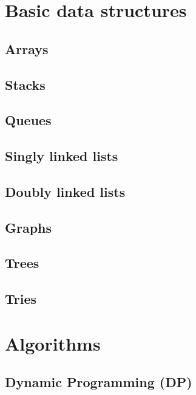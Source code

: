 \chapter{Basic data structures}
\section{Arrays}


\section{Stacks}


\section{Queues}


\section{Singly linked lists}


\section{Doubly linked lists}


\section{Graphs}


\section{Trees}


\section{Tries}

\chapter{Algorithms}
\section{Dynamic Programming (DP)}
